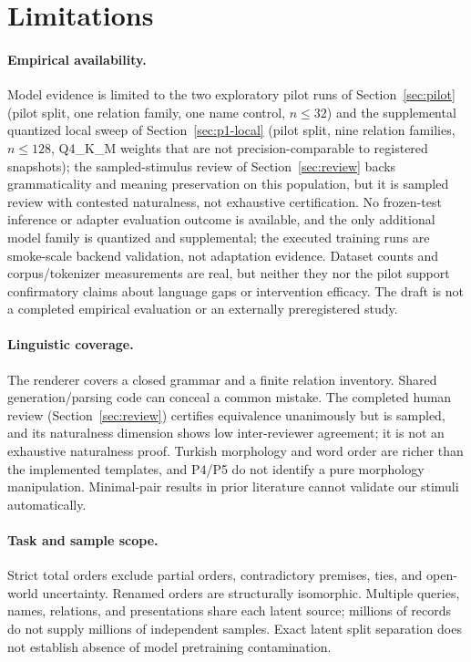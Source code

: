 \section{Limitations}

\paragraph{Empirical availability.}
Model evidence is limited to the two exploratory pilot runs of Section~\ref{sec:pilot} (pilot split, one
relation family, one name control, $n \le 32$) and the supplemental quantized local sweep of
Section~\ref{sec:p1-local} (pilot split, nine relation families, $n \le 128$, Q4\_K\_M weights that are
not precision-comparable to registered snapshots); the sampled-stimulus review of
Section~\ref{sec:review} backs grammaticality and meaning preservation on this population, but it is
sampled review with contested naturalness, not exhaustive certification. No
frozen-test inference or adapter evaluation outcome is available, and the only additional model family is
quantized and supplemental; the executed training runs are smoke-scale backend validation, not adaptation
evidence. Dataset counts
and corpus/tokenizer measurements are real, but neither they nor the pilot support confirmatory claims
about language gaps or intervention efficacy. The draft is not a completed empirical evaluation or an
externally preregistered study.

\paragraph{Linguistic coverage.}
The renderer covers a closed grammar and a finite relation inventory. Shared generation/parsing code can
conceal a common mistake. The completed human review (Section~\ref{sec:review}) certifies equivalence
unanimously but is sampled, and its naturalness dimension shows low inter-reviewer agreement; it is not an
exhaustive naturalness proof. Turkish morphology and word
order are richer than the implemented templates, and P4/P5 do not identify a pure morphology manipulation.
Minimal-pair results in prior literature cannot validate our stimuli automatically.

\paragraph{Task and sample scope.}
Strict total orders exclude partial orders, contradictory premises, ties, and open-world uncertainty.
Renamed orders are structurally isomorphic. Multiple queries, names, relations, and presentations share each
latent source; millions of records do not supply millions of independent samples. Exact latent split
separation does not establish absence of model pretraining contamination.


